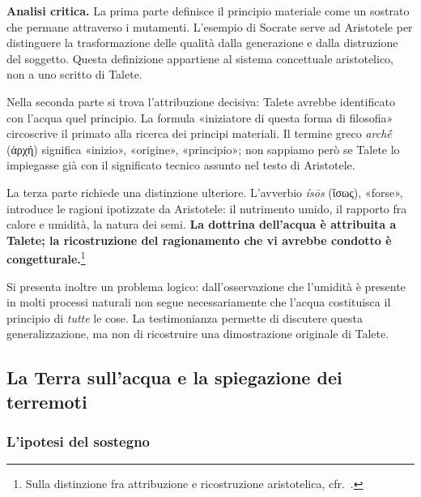 
\noindent\textbf{Analisi critica.}
La prima parte definisce il principio materiale come un sostrato che permane attraverso i mutamenti. L'esempio di Socrate serve ad Aristotele per distinguere la trasformazione delle qualità dalla generazione e dalla distruzione del soggetto. Questa definizione appartiene al sistema concettuale aristotelico, non a uno scritto di Talete.

Nella seconda parte si trova l'attribuzione decisiva: Talete avrebbe identificato con l'acqua quel principio. La formula «iniziatore di questa forma di filosofia» circoscrive il primato alla ricerca dei principi materiali. Il termine greco \emph{archḗ} (ἀρχή) significa «inizio», «origine», «principio»; non sappiamo però se Talete lo impiegasse già con il significato tecnico assunto nel testo di Aristotele.

La terza parte richiede una distinzione ulteriore. L'avverbio \emph{ísōs} (ἴσως), «forse», introduce le ragioni ipotizzate da Aristotele: il nutrimento umido, il rapporto fra calore e umidità, la natura dei semi. \textbf{La dottrina dell'acqua è attribuita a Talete; la ricostruzione del ragionamento che vi avrebbe condotto è congetturale.}\footnote{Sulla distinzione fra attribuzione e ricostruzione aristotelica, cfr.\ \cite[18--19]{palumbo2015}.}

Si presenta inoltre un problema logico: dall'osservazione che l'umidità è presente in molti processi naturali non segue necessariamente che l'acqua costituisca il principio di \emph{tutte} le cose. La testimonianza permette di discutere questa generalizzazione, ma non di ricostruire una dimostrazione originale di Talete.

\subsection{La Terra sull'acqua e la spiegazione dei terremoti}

\subsubsection{L'ipotesi del sostegno}

